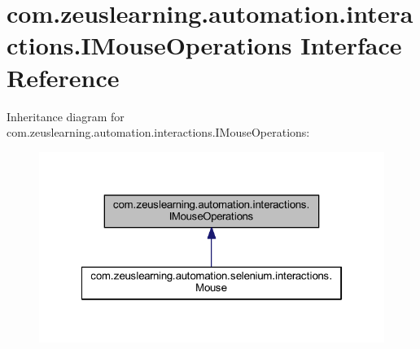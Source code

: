 \hypertarget{interfacecom_1_1zeuslearning_1_1automation_1_1interactions_1_1IMouseOperations}{}\section{com.\+zeuslearning.\+automation.\+interactions.\+I\+Mouse\+Operations Interface Reference}
\label{interfacecom_1_1zeuslearning_1_1automation_1_1interactions_1_1IMouseOperations}


Inheritance diagram for com.\+zeuslearning.\+automation.\+interactions.\+I\+Mouse\+Operations\+:\nopagebreak
\begin{figure}[H]
\begin{center}
\leavevmode
\includegraphics[width=322pt]{dd/d0b/interfacecom_1_1zeuslearning_1_1automation_1_1interactions_1_1IMouseOperations__inherit__graph}
\end{center}
\end{figure}
